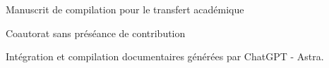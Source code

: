 \thispagestyle{plain}
\begin{center}
{\fontsize{10}{12}\selectfont Manuscrit de compilation pour le transfert académique\par}
\vspace{6mm}
{\fontsize{17}{20.5}\selectfont\bfseries\Titulo\par}
\vspace{8pt}
{\fontsize{13}{16}\selectfont\bfseries\TituloSegundo\par}
\vspace{11pt}
{\fontsize{11.5}{14}\selectfont\Autores\par}
\vspace{4pt}
{\fontsize{8}{10}\selectfont Coautorat sans préséance de contribution\par}
\vspace{3pt}
{\fontsize{8}{10}\selectfont Intégration et compilation documentaires générées par ChatGPT - Astra.\par}
\end{center}
\vspace{7pt}
